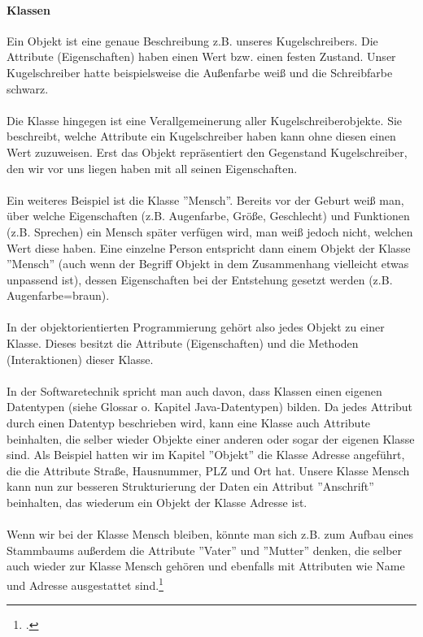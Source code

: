 \paragraph{Klassen}
Ein Objekt ist eine genaue Beschreibung z.B. unseres Kugelschreibers. Die Attribute (Eigenschaften) haben  einen Wert bzw. einen festen Zustand. Unser Kugelschreiber hatte beispielsweise die Außenfarbe weiß und die Schreibfarbe schwarz.\\
\\
Die Klasse hingegen ist eine Verallgemeinerung aller Kugelschreiberobjekte. Sie beschreibt, welche Attribute ein Kugelschreiber haben kann ohne diesen einen Wert zuzuweisen. Erst das Objekt repräsentiert den Gegenstand Kugelschreiber, den wir vor uns liegen haben mit  all seinen Eigenschaften.\\
\\
Ein weiteres Beispiel ist die Klasse ''Mensch''. Bereits vor der Geburt weiß man, über welche Eigenschaften (z.B. Augenfarbe, Größe, Geschlecht) und Funktionen (z.B. Sprechen) ein Mensch später verfügen wird, man weiß jedoch nicht, welchen Wert diese haben. Eine einzelne Person entspricht dann einem Objekt der Klasse ''Mensch'' (auch wenn der Begriff Objekt in dem Zusammenhang vielleicht etwas unpassend ist), dessen Eigenschaften bei der Entstehung gesetzt werden (z.B. Augenfarbe=braun).\\
\\
In der objektorientierten Programmierung  gehört also jedes Objekt zu einer Klasse. Dieses besitzt die Attribute (Eigenschaften) und die Methoden (Interaktionen) dieser Klasse.\\
\\
In der Softwaretechnik spricht man auch davon, dass Klassen einen eigenen Datentypen (siehe Glossar o. Kapitel Java-Datentypen) bilden. Da jedes Attribut durch einen Datentyp beschrieben wird, kann eine Klasse auch Attribute beinhalten, die selber wieder Objekte einer anderen oder sogar der eigenen Klasse sind. Als Beispiel hatten wir im Kapitel ''Objekt'' die Klasse Adresse angeführt, die die Attribute Straße, Hausnummer, PLZ und Ort hat. Unsere Klasse Mensch kann nun zur besseren Strukturierung der Daten  ein Attribut ''Anschrift'' beinhalten, das wiederum ein Objekt der Klasse Adresse ist.\\
\\
Wenn wir bei der Klasse Mensch bleiben, könnte man sich z.B. zum Aufbau eines Stammbaums außerdem die Attribute ''Vater'' und ''Mutter'' denken, die selber auch wieder zur Klasse Mensch gehören und ebenfalls mit Attributen wie Name und Adresse ausgestattet sind.\footcite{shit_java_tut}
 
